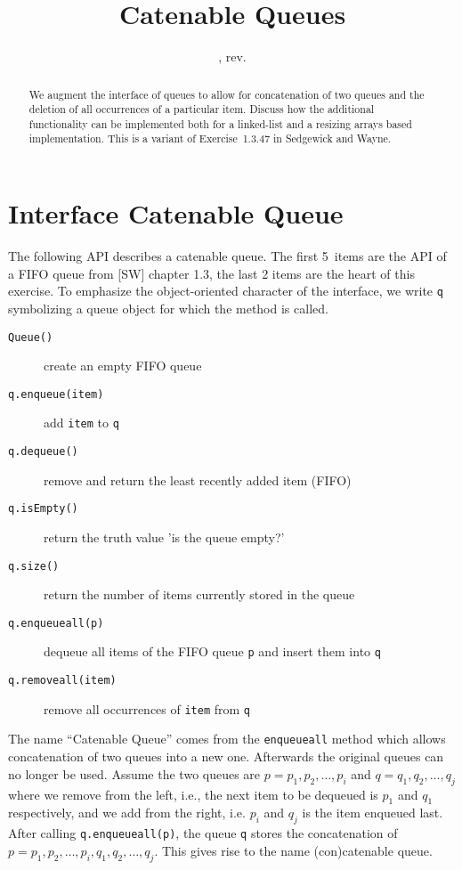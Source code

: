 \documentclass{tufte-handout}
\title{Catenable Queues}
\author{}
\date{\GITAuthorDate, rev. \GITAbrHash}
\begin{document}
\maketitle

\begin{abstract}
  We augment the interface of queues to allow for concatenation of two queues and the deletion of all occurrences of a particular item.
  Discuss how the additional functionality can be implemented both for a linked-list and a resizing arrays based implementation.
  This is a variant of Exercise~1.3.47 in Sedgewick and Wayne.
\end{abstract}

\section{Interface Catenable Queue}

The following API describes a catenable queue. The first 5~items are the API of a FIFO queue from [SW] chapter 1.3, the last 2 items are the heart of this exercise.
To emphasize the object-oriented character of the interface, we write \texttt{q} symbolizing a queue object for which the method is called.
\begin{description}
\item [\texttt{Queue()}] create an empty FIFO queue
\item[\texttt{q.enqueue(item)}] add \texttt{item} to \texttt{q}
\item[\texttt{q.dequeue()}] remove and return the least recently added item (FIFO)
\item[\texttt{q.isEmpty()}] return the truth value 'is the queue empty?'
\item[\texttt{q.size()}] return the number of items currently stored in the queue
\item[\texttt{q.enqueueall(p)}] dequeue all items of the FIFO queue \texttt{p} and insert them into \texttt{q}
\item[\texttt{q.removeall(item)}] remove all occurrences of \texttt{item} from \texttt{q}
\end{description}

The name ``Catenable Queue'' comes from the \texttt{enqueueall} method which allows concatenation of two queues into a new one.
Afterwards the original queues can no longer be used.
Assume the two queues are $p=p_1,p_2,\ldots,p_i$ and $q=q_1,q_2,\ldots,q_j$ where we remove from the left, i.e., the next item to be {dequeued} is $p_1$ and $q_1$ respectively, and we add from the right, i.e. $p_i$ and $q_j$ is the item enqueued last.
After calling \texttt{q.enqueueall(p)}, the queue \texttt{q} stores the concatenation of $p=p_1,p_2,\ldots,p_i,q_1,q_2,\ldots,q_j$.
This gives rise to the name (con)catenable queue.
\end{document}
